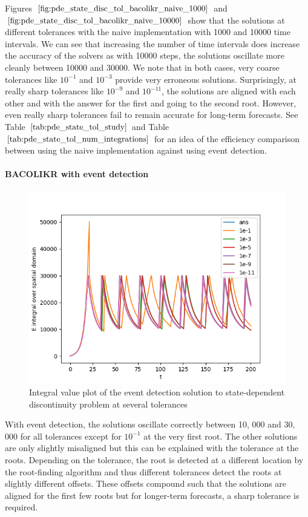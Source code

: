 \documentclass{article}
\begin{document}
Figures $\ref{fig:pde_state_disc_tol_bacolikr_naive_1000}$ and $\ref{fig:pde_state_disc_tol_bacolikr_naive_10000}$ show that the solutions at different tolerances with the naive implementation with 1000 and 10000 time intervals. We can see that increasing the number of time intervals does increase the accuracy of the solvers as with 10000 steps, the solutions oscillate more cleanly between 10000 and 30000. We note that in both cases, very coarse tolerances like $10^{-1}$ and $10^{-3}$ provide very erroneous solutions. Surprisingly, at really sharp tolerances like $10^{-9}$ and $10^{-11}$, the solutions are aligned with each other and with the answer for the first and going to the second root. However, even really sharp tolerances fail to remain accurate for long-term forecasts. See Table $\ref{tab:pde_state_tol_study}$ and Table $\ref{tab:pde_state_tol_num_integrations}$ for an idea of the efficiency comparison between using the naive implementation against using event detection.

\paragraph{BACOLIKR with event detection}
\begin{figure}[H]
\centering
\includegraphics[width=0.7\linewidth]{./figures/pde_state_disc_tol_event}
\caption{Integral value plot of the event detection solution to state-dependent discontinuity problem at several tolerances}
\label{fig:pde_state_disc_tol_event}
\end{figure}

With event detection, the solutions oscillate correctly between 10, 000 and 30, 000 for all tolerances except for $10^{-1}$ at the very first root. The other solutions are only slightly misaligned but this can be explained with the tolerance at the roots. Depending on the tolerance, the root is detected at a different location by the root-finding algorithm and thus different tolerances detect the roots at slightly different offsets. These offsets compound such that the solutions are aligned for the first few roots but for longer-term forecasts, a sharp tolerance is required. 
\end{document}

